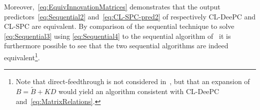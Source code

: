 Moreover,~\eqref{eq:EquivInnovationMatrices} demonstrates that the output predictors~\eqref{eq:Sequential2} and~\eqref{eq:CL-SPC-pred2} of respectively \ac{CL-DeePC} and \ac{CL-SPC} are equivalent. By comparison of the sequential technique to solve \eqref{eq:Sequential3} using \eqref{eq:Sequential4} to the sequential algorithm of~\cite{Dong2008} it is furthermore possible to see that the two sequential algorithms are indeed equivalent\footnote{Note that direct-feedthrough is not considered in~\cite{Dong2008}, but that an expansion of $B=\tilde{B}+KD$ would yield an algorithm consistent with \ac{CL-DeePC} and~\eqref{eq:MatrixRelations}.}.

